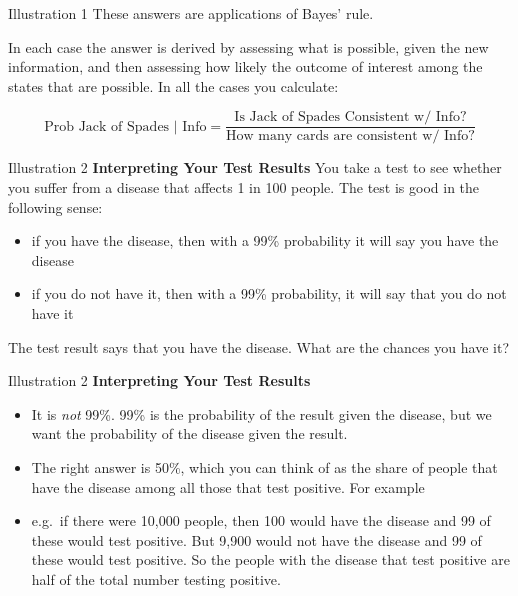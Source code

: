 \documentclass[
  11pt,
  ignorenonframetext,
]{beamer}
\providecommand{\tightlist}{%
  \setlength{\itemsep}{0pt}\setlength{\parskip}{0pt}}\usepackage{longtable,booktabs,array}
\begin{document}
\begin{frame}{Illustration 1}
\protect\hypertarget{illustration-1-2}{}
These answers are applications of Bayes' rule.

In each case the answer is derived by assessing what is possible, given
the new information, and then assessing how likely the outcome of
interest among the states that are possible. In all the cases you
calculate:

\[\text{Prob Jack of Spades | Info} = \frac{\text{Is Jack of Spades Consistent w/ Info?}}{\text{How many cards are consistent w/ Info?}} \]
\end{frame}

\begin{frame}{Illustration 2 \textbf{Interpreting Your Test Results}}
\protect\hypertarget{illustration-2-interpreting-your-test-results}{}
You take a test to see whether you suffer from a disease that affects 1
in 100 people. The test is good in the following sense:

\begin{itemize}
\tightlist
\item
  if you have the disease, then with a 99\% probability it will say you
  have the disease
\item
  if you do not have it, then with a 99\% probability, it will say that
  you do not have it
\end{itemize}

The test result says that you have the disease. What are the chances you
have it?
\end{frame}

\begin{frame}{Illustration 2 \textbf{Interpreting Your Test Results}}
\protect\hypertarget{illustration-2-interpreting-your-test-results-1}{}
\begin{itemize}
\item
  It is \emph{not} 99\%. 99\% is the probability of the result given the
  disease, but we want the probability of the disease given the result.
\item
  The right answer is 50\%, which you can think of as the share of
  people that have the disease among all those that test positive. For
  example
\item
  e.g.~if there were 10,000 people, then 100 would have the disease and
  99 of these would test positive. But 9,900 would not have the disease
  and 99 of these would test positive. So the people with the disease
  that test positive are half of the total number testing positive.
\end{itemize}
\end{frame}
\end{document}
